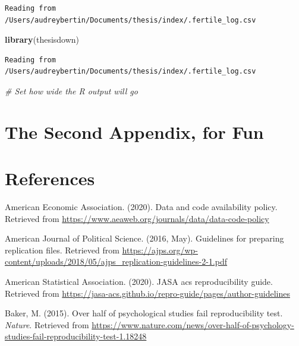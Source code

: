 \documentclass[12pt,twoside]{reedthesis}
\newenvironment{Shaded}{\begin{snugshade}}{\end{snugshade}}
\newcommand{\KeywordTok}[1]{\textcolor[rgb]{0.13,0.29,0.53}{\textbf{#1}}}
\newcommand{\CommentTok}[1]{\textcolor[rgb]{0.56,0.35,0.01}{\textit{#1}}}
\newcommand{\NormalTok}[1]{#1}
\begin{document}
\begin{verbatim}
Reading from /Users/audreybertin/Documents/thesis/index/.fertile_log.csv
\end{verbatim}
\begin{Shaded}
\begin{Highlighting}[]
\KeywordTok{library}\NormalTok{(thesisdown)}
\end{Highlighting}
\end{Shaded}
\begin{verbatim}
Reading from /Users/audreybertin/Documents/thesis/index/.fertile_log.csv
\end{verbatim}
\begin{Shaded}
\begin{Highlighting}[]
\CommentTok{# Set how wide the R output will go}
\end{Highlighting}
\end{Shaded}
\chapter{The Second Appendix, for
Fun}\label{the-second-appendix-for-fun}

\backmatter

\chapter*{References}\label{references}


\noindent

\setlength{\parindent}{-0.20in} \setlength{\leftskip}{0.20in}
\setlength{\parskip}{8pt}

\hypertarget{refs}{}
\hypertarget{ref-aee-policy}{}
American Economic Association. (2020). Data and code availability
policy. Retrieved from
\url{https://www.aeaweb.org/journals/data/data-code-policy}

\hypertarget{ref-ajps-guidelines}{}
American Journal of Political Science. (2016, May). Guidelines for
preparing replication files. Retrieved from
\url{https://ajps.org/wp-content/uploads/2018/05/ajps_replication-guidelines-2-1.pdf}

\hypertarget{ref-asa-guide}{}
American Statistical Association. (2020). JASA acs reproducibility
guide. Retrieved from
\url{https://jasa-acs.github.io/repro-guide/pages/author-guidelines}

\hypertarget{ref-nature-psych}{}
Baker, M. (2015). Over half of psychological studies fail
reproducibility test. \emph{Nature}. Retrieved from
\url{https://www.nature.com/news/over-half-of-psychology-studies-fail-reproducibility-test-1.18248}
\end{document}
